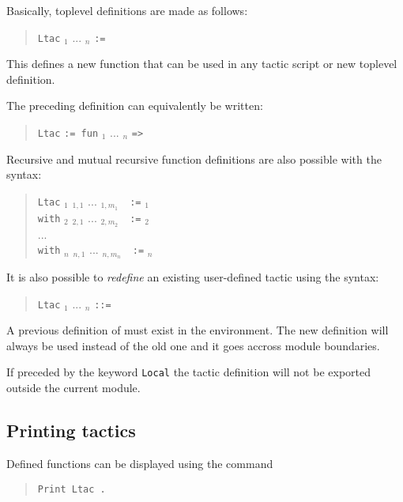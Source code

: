 Basically, {\ltac} toplevel definitions are made as follows:
%
%
\begin{quote}
{\tt Ltac} {\ident} {\ident}$_1$ ... {\ident}$_n$ {\tt :=}
{\tacexpr}
\end{quote}
This defines a new {\ltac} function that can be used in any tactic
script or new {\ltac} toplevel definition.

\Rem The preceding definition can equivalently be written:
\begin{quote}
{\tt Ltac} {\ident} {\tt := fun} {\ident}$_1$ ... {\ident}$_n$
{\tt =>} {\tacexpr}
\end{quote}
Recursive and mutual recursive function definitions are also
possible with the syntax:
\begin{quote}
{\tt Ltac} {\ident}$_1$ {\ident}$_{1,1}$ ...
{\ident}$_{1,m_1}$~~{\tt :=} {\tacexpr}$_1$\\
{\tt with} {\ident}$_2$ {\ident}$_{2,1}$ ... {\ident}$_{2,m_2}$~~{\tt :=}
{\tacexpr}$_2$\\
...\\
{\tt with} {\ident}$_n$ {\ident}$_{n,1}$ ... {\ident}$_{n,m_n}$~~{\tt :=}
{\tacexpr}$_n$
\end{quote}
\medskip
It is also possible to \emph{redefine} an existing user-defined tactic
using the syntax:
\begin{quote}
{\tt Ltac} {\qualid} {\ident}$_1$ ... {\ident}$_n$ {\tt ::=}
{\tacexpr}
\end{quote}
A previous definition of \qualid must exist in the environment.
The new definition will always be used instead of the old one and
it goes accross module boundaries.

If preceded by the keyword {\tt Local} the tactic definition will not
be exported outside the current module.

\subsection[Printing {\ltac} tactics]{Printing {\ltac} tactics}

Defined {\ltac} functions can be displayed using the command

\begin{quote}
{\tt Print Ltac {\qualid}.}
\end{quote}

